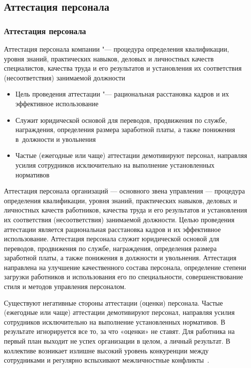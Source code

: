\documentclass{../industrial-development}
\begin{document}
\subsection{Аттестация персонала}

\begin{frame} \frametitle{Аттестация персонала}
	
 \alert{Аттестация персонала компании} "--- процедура определения квалификации, уровня знаний, практических навыков, деловых и личностных качеств специалистов, качества труда и его результатов и установления их соответствия (несоответствия) занимаемой должности 
	
  \begin{itemize}
	\item Цель проведения аттестации "--- рациональная расстановка кадров и их эффективное использование
	\item Служит юридической основой для переводов, продвижения по службе, награждения, определения размера заработной платы, а также понижения в~должности и увольнения
	\item Частые (ежегодные или чаще) аттестации демотивируют персонал, направляя усилия сотрудников исключительно на выполнение установленных нормативов
	  \end{itemize}
		
	\end{frame}

\lecturenotes

Аттестация персонала организаций — основного звена управления — процедура определения квалификации, уровня знаний, практических навыков, деловых и личностных качеств работников, качества труда и его результатов и установления их соответствия (несоответствия) занимаемой должности. Целью проведения аттестации является рациональная расстановка кадров и их эффективное использование. Аттестация персонала служит юридической основой для переводов, продвижения по службе, награждения, определения размера заработной платы, а также понижения в должности и увольнения. Аттестация направлена на улучшение качественного состава персонала, определение степени загрузки работников и использования его по специальности, совершенствование стиля и методов управления персоналом.

Существуют негативные стороны аттестации (оценки) персонала. Частые (ежегодные или чаще) аттестации демотивируют персонал, направляя усилия сотрудников исключительно на выполнение установленных нормативов. В результате игнорируется все то, за что «оценки» не ставят. Для работника на первый план выходит не успех организации в целом, а личный результат. В коллективе возникает излишне высокий уровень конкуренции между сотрудниками и регулярно вспыхивают межличностные конфликты~\cite[с.~418]{Kibanov}.
\end{document}
